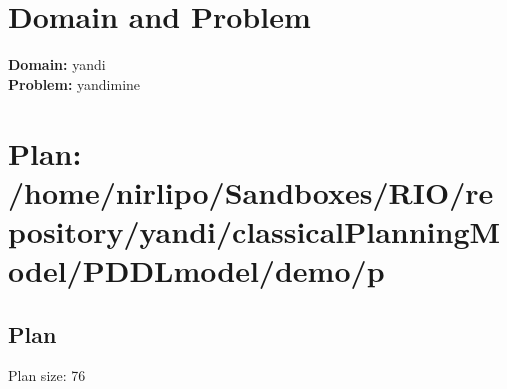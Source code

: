 \documentclass[a4paper,12pt]{article}
\author{\mbox{\sc {\sc Val}}}
\begin{document}
 \maketitle 
\section{Domain and Problem}
{\bf Domain:} yandi\\
{\bf Problem:} yandimine
\section{\sloppy Plan: /\-home/\-nirlipo/\-Sandboxes/\-RIO/\-repository/\-yandi/\-classicalPlanningModel/\-PDDLmodel/\-demo/\-p}
\subsection{Plan}
Plan size: 76
\end{document}
